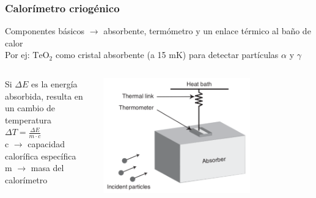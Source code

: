 \documentclass{beamer}
\begin{document}
\begin{frame}
				\frametitle{Calorímetro criogénico}
				Componentes básicos $\to$ absorbente, termómetro y un enlace térmico al
				baño de calor\\
				Por ej: $\text{TeO}_2$ como cristal absorbente (a 15 mK) para detectar
				partículas $\alpha$ y $\gamma$
				\begin{columns}
								\begin{column}{0.35\textwidth}
												Si $\Delta E$ es la energía absorbida, resulta en un
												cambio de temperatura\\ \vspace{0.5cm} \alert{$\Delta T = \frac{\Delta
												E}{m\cdot c}$}\\\vspace{.5cm}
												c $\to$ capacidad calorífica específica\\
												m $\to$ masa del calorímetro
								\end{column}
								\begin{column}{0.65\textwidth}
								\begin{center}
												\includegraphics[height=0.58\textheight,width=0.7\textwidth]{microcalorimetro}
								\end{center}
								\end{column}
				\end{columns}
\end{frame} 
\end{document}
